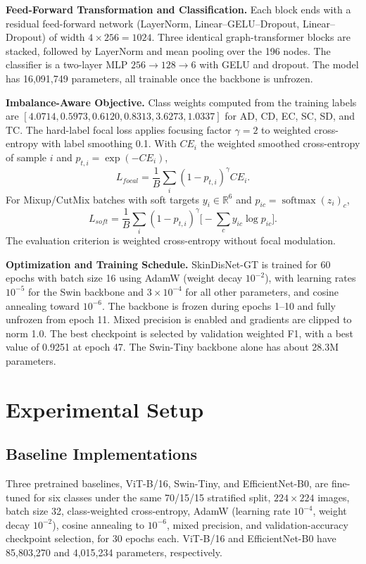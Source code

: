 \documentclass[conference]{IEEEtran}
\begin{document}
\textbf{Feed-Forward Transformation and Classification.} Each block ends with a residual feed-forward network (LayerNorm, Linear--GELU--Dropout, Linear--Dropout) of width $4\times256 = 1024$. Three identical graph-transformer blocks are stacked, followed by LayerNorm and mean pooling over the 196 nodes. The classifier is a two-layer MLP $256 \rightarrow 128 \rightarrow 6$ with GELU and dropout. The model has 16,091,749 parameters, all trainable once the backbone is unfrozen.

\textbf{Imbalance-Aware Objective.} Class weights computed from the training labels are $[4.0714, 0.5973, 0.6120, 0.8313, 3.6273, 1.0337]$ for AD, CD, EC, SC, SD, and TC. The hard-label focal loss applies focusing factor $\gamma=2$ to weighted cross-entropy with label smoothing 0.1. With $CE_i$ the weighted smoothed cross-entropy of sample $i$ and $p_{t,i} = \exp(-CE_i)$,
\begin{equation}
L_{focal} = \frac{1}{B} \sum_{i} (1 - p_{t,i})^{\gamma} CE_i.
\label{eq:focal_loss}
\end{equation}
For Mixup/CutMix batches with soft targets $y_i \in \mathbb{R}^6$ and $p_{ic} = \operatorname{softmax}(z_i)_c$,
\begin{equation}
L_{soft} = \frac{1}{B} \sum_{i} (1 - p_{t,i})^{\gamma} \Big[ -\sum_{c} y_{ic} \log p_{ic} \Big].
\label{eq:soft_loss}
\end{equation}
The evaluation criterion is weighted cross-entropy without focal modulation.

\textbf{Optimization and Training Schedule.} SkinDisNet-GT is trained for 60 epochs with batch size 16 using AdamW (weight decay $10^{-2}$), with learning rates $10^{-5}$ for the Swin backbone and $3\times10^{-4}$ for all other parameters, and cosine annealing toward $10^{-6}$. The backbone is frozen during epochs 1--10 and fully unfrozen from epoch 11. Mixed precision is enabled and gradients are clipped to norm 1.0. The best checkpoint is selected by validation weighted F1, with a best value of 0.9251 at epoch 47. The Swin-Tiny backbone alone has about 28.3M parameters.

\section{Experimental Setup}
\subsection{Baseline Implementations}
Three pretrained baselines, ViT-B/16, Swin-Tiny, and EfficientNet-B0, are fine-tuned for six classes under the same 70/15/15 stratified split, $224\times224$ images, batch size 32, class-weighted cross-entropy, AdamW (learning rate $10^{-4}$, weight decay $10^{-2}$), cosine annealing to $10^{-6}$, mixed precision, and validation-accuracy checkpoint selection, for 30 epochs each. ViT-B/16 and EfficientNet-B0 have 85,803,270 and 4,015,234 parameters, respectively.
\end{document}
